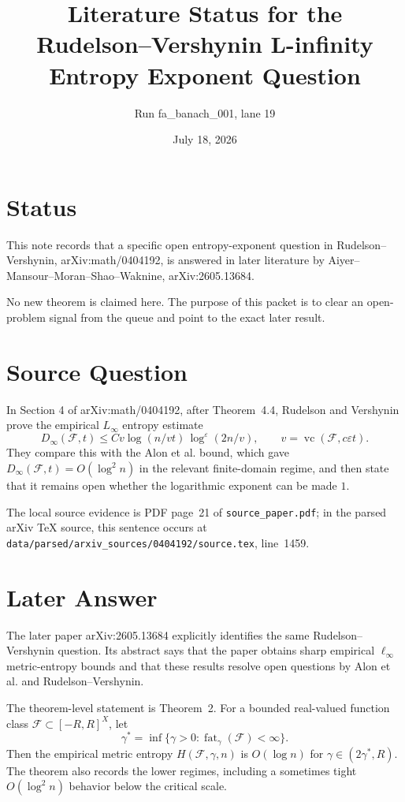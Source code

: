 \documentclass[11pt]{article}
\title{Literature Status for the Rudelson--Vershynin L-infinity Entropy Exponent Question}
\author{Run fa\_banach\_001, lane 19}
\date{July 18, 2026}
\newcommand{\F}{\mathcal F}
\newcommand{\fat}{\operatorname{fat}}
\newcommand{\vc}{\operatorname{vc}}
\begin{document}
\maketitle

\section*{Status}

This note records that a specific open entropy-exponent question in
Rudelson--Vershynin, arXiv:math/0404192, is answered in later literature by
Aiyer--Mansour--Moran--Shao--Waknine, arXiv:2605.13684.

No new theorem is claimed here. The purpose of this packet is to clear an
open-problem signal from the queue and point to the exact later result.

\section*{Source Question}

In Section 4 of arXiv:math/0404192, after Theorem~4.4, Rudelson and Vershynin
prove the empirical $L_\infty$ entropy estimate
\[
  D_\infty(\F,t)
  \le C v \log(n/vt)\,\log^\varepsilon(2n/v),
  \qquad v=\vc(\F,c\varepsilon t).
\]
They compare this with the Alon et al. bound, which gave
$D_\infty(\F,t)=O(\log^2 n)$ in the relevant finite-domain regime, and then
state that it remains open whether the logarithmic exponent can be made $1$.

The local source evidence is PDF page~21 of \texttt{source\_paper.pdf}; in the
parsed arXiv TeX source, this sentence occurs at
\texttt{data/parsed/arxiv\_sources/0404192/source.tex}, line~1459.

\section*{Later Answer}

The later paper arXiv:2605.13684 explicitly identifies the same
Rudelson--Vershynin question. Its abstract says that the paper obtains sharp
empirical $\ell_\infty$ metric-entropy bounds and that these results resolve
open questions by Alon et al. and Rudelson--Vershynin.

The theorem-level statement is Theorem~2. For a bounded real-valued function
class $\F\subset [-R,R]^X$, let
\[
  \gamma^\ast=\inf\{\gamma>0:\fat_\gamma(\F)<\infty\}.
\]
Then the empirical metric entropy $H(\F,\gamma,n)$ is $O(\log n)$ for
$\gamma\in(2\gamma^\ast,R)$. The theorem also records the lower regimes,
including a sometimes tight $O(\log^2 n)$ behavior below the critical scale.
\end{document}
